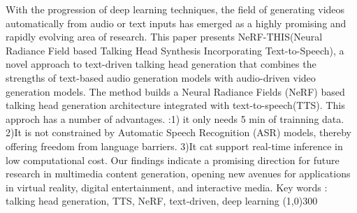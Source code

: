 \label{abstract}
With the progression of deep learning techniques, the field of generating videos automatically from audio or text inputs has emerged as a highly promising and rapidly evolving area of research.
This paper presents NeRF-THIS(Neural Radiance Field based Talking Head Synthesis Incorporating Text-to-Speech), a novel approach to text-driven talking head generation that combines the strengths of text-based audio generation models with audio-driven video generation models.
The method builds a Neural Radiance Fields (NeRF) based talking head generation architecture integrated with text-to-speech(TTS). This approch has a number of advantages.
:1) it only needs 5 min of trainning data. 2)It is not constrained by Automatic Speech Recognition (ASR) models, thereby offering freedom from language barriers.
3)It cat support real-time inference in low computational cost.
Our findings indicate a promising direction for future research in multimedia content generation, opening new avenues for applications in virtual reality, digital entertainment, and interactive media.\newline
Key words : talking head generation, TTS, NeRF, text-driven, deep learning \newline
\line(1,0){300}